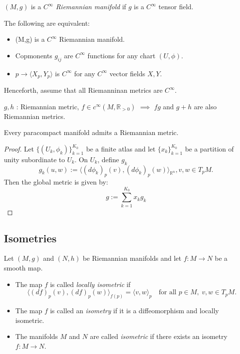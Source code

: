 \begin{definition}
$(M,g)$ is a \emph{$C^{\infty}$ Riemannian manifold} if $g$ is a $C^{\infty}$ tensor field.
\end{definition}
\begin{proposition}
The following are equivalent:
\begin{itemize}
    \item (M,g) is a $C^{\infty}$ Riemannian manifold.
    \item Copmonents $g_{ij}$ are $C^{\infty}$ functions for any chart $(U, \phi)$.
    \item $p \to \langle X_p, Y_p \rangle$ is $C^{\infty}$ for any $C^{\infty}$ vector fields $X,Y$.
\end{itemize}    
\end{proposition}
Henceforth, assume that all Riemanninan metrics are $C^{\infty}$.
\begin{remark}
$g,h$ : Riemannian metric, $f \in c^{\infty} ( M, \mathbb{R}_{>0})$
$\implies$ $fg$ and $g+h$ are also Riemannian metrics.
\end{remark}

\begin{proposition}
    Every paracompact manifold admits a Riemannian metric.
\end{proposition}

\begin{proof}
    Let $\{(U_k, \phi_k)\}_{k=1}^{K_0}$ be a finite atlas and let $\{x_k\}^{K_0}_{k=1}$
    be a partition of unity subordinate to ${U_k}$. On $U_k$, define $g_k$
    \[
    g_k(u,w) := \langle(d \phi_k)_p(v), (d \phi_k)_p (w) \rangle_{\mathbb{R}^n}, v,w \in T_pM.
    \]
    Then the global metric is given by:
    \[
    g := \sum_{k=1}^{K_0} x_k g_k
    \]
\end{proof}

\subsection{Isometries}

\begin{definition}[Isometry]
Let $(M,g)$ and $(N,h)$ be Riemannian manifolds and let $f : M \to N$ be a smooth map.
\begin{itemize}
\item The map $f$ is called \emph{locally isometric} if
\[
\langle (df)_p(v), (df)_p(w) \rangle_{f(p)} = \langle v, w \rangle_p
\quad \text{for all } p \in M, \; v,w \in T_pM.
\]
\item The map $f$ is called an \emph{isometry} if it is a diffeomorphism and locally isometric.
\item The manifolds $M$ and $N$ are called \emph{isometric} if there exists an isometry $f : M \to N$.
\end{itemize}
\end{definition}

